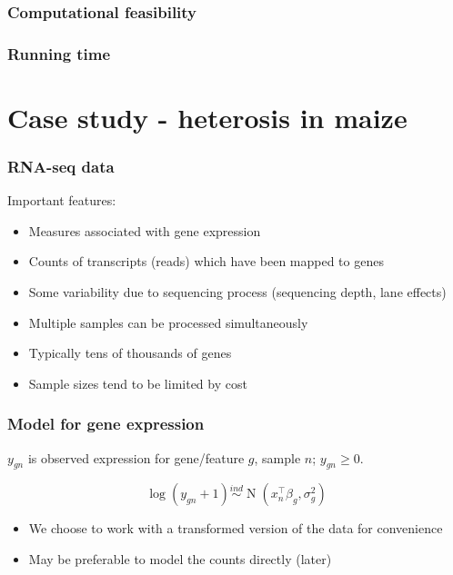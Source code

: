 \documentclass{beamer}
\newcommand{\op}{\operatorname}
\newcommand{\ind}{\stackrel{ind}{\sim}}
\begin{document}
\begin{frame}
\frametitle{Computational feasibility}
\end{frame}

\begin{frame}
\frametitle{Running time}
\end{frame}

\section{Case study - heterosis in maize}


\begin{frame}
\frametitle{RNA-seq data}

Important features:
  
  \begin{itemize}
\item Measures associated with gene expression
\item Counts of transcripts (reads) which have been mapped to genes
\item Some variability due to sequencing process (sequencing depth, lane effects)
\item Multiple samples can be processed simultaneously
\item Typically tens of thousands of genes
\item Sample sizes tend to be limited by cost

\end{itemize}
\vspace{1cm}
{\small \citep{datta2014}}
\end{frame}



\begin{frame}
\frametitle{Model for gene expression}
$y_{gn}$ is observed expression for gene/feature $g$, sample $n$; $y_{gn} \ge 0$.

\[\log(y_{gn}+1) \ind \op{N}\left(x_{n}^\top\beta_g, \sigma^2_g\right) \]

\begin{itemize}
\item We choose to work with a transformed version of the data for convenience

\item May be preferable to model the counts directly (later)
\end{itemize}
\end{frame}
\end{document}
